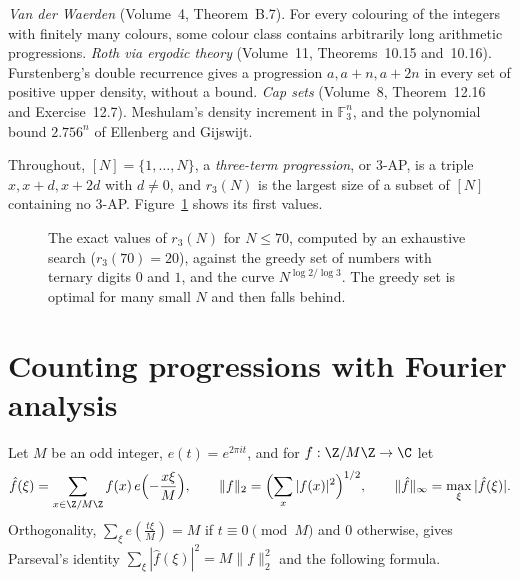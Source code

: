 \begin{reminder}
\emph{Van der Waerden} (Volume~4, Theorem~B.7). For every colouring of the integers with finitely many colours, some colour class contains arbitrarily long arithmetic progressions.
\emph{Roth via ergodic theory} (Volume~11, Theorems~10.15 and~10.16). Furstenberg's double recurrence gives a progression $a,a+n,a+2n$ in every set of positive upper density, without a bound.
\emph{Cap sets} (Volume~8, Theorem~12.16 and Exercise~12.7). Meshulam's density increment in $\mathbb F_3^n$, and the polynomial bound $2.756^n$ of Ellenberg and Gijswijt.
\end{reminder}

Throughout, $[N]=\{1,\dots,N\}$, a \emph{three-term progression}, or $3$-AP, is a triple $x,x+d,x+2d$ with $d\neq0$, and $r_3(N)$ is the largest size of a subset of $[N]$ containing no $3$-AP. Figure~\ref{fig:r3} shows its first values.

\begin{figure}[ht]
\centering
{}
\caption{The exact values of $r_3(N)$ for $N\le70$, computed by an exhaustive search ($r_3(70)=20$), against the greedy set of numbers with ternary digits $0$ and $1$, and the curve $N^{\log2/\log3}$. The greedy set is optimal for many small $N$ and then falls behind.}
\label{fig:r3}
\end{figure}

\section{Counting progressions with Fourier analysis}

Let $M$ be an odd integer, $e(t)=e^{2\pi it}$, and for $f:\Z/M\Z\to\C$ let
\[
\hat f(\xi)=\sum_{x\in\Z/M\Z}f(x)\,e\Bigl(-\frac{x\xi}M\Bigr),\qquad\|f\|_2=\Bigl(\sum_x|f(x)|^2\Bigr)^{1/2},\qquad\|\hat f\|_\infty=\max_\xi|\hat f(\xi)|.
\]
Orthogonality, $\sum_{\xi}e(\frac{t\xi}M)=M$ if $t\equiv0\pmod M$ and $0$ otherwise, gives Parseval's identity $\sum_\xi|\hat f(\xi)|^2=M\|f\|_2^2$ and the following formula.

